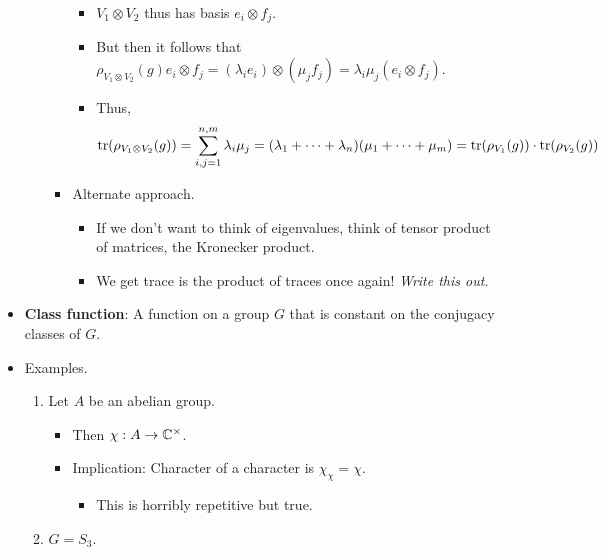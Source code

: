 \documentclass[../notes.tex]{subfiles}
\begin{document}
\begin{itemize}
\begin{enumerate}[resume]
\begin{itemize}
\begin{itemize}
                \item $V_1\otimes V_2$ thus has basis $e_i\otimes f_j$.
                \item But then it follows that $\rho_{V_1\otimes V_2}(g)e_i\otimes f_j=(\lambda_ie_i)\otimes(\mu_jf_j)=\lambda_i\mu_j(e_i\otimes f_j)$.
                \item Thus,
                \begin{equation*}
                    \tr(\rho_{V_1\otimes V_2}(g)) = \sum_{i,j=1}^{n,m}\lambda_i\mu_j
                    = (\lambda_1+\cdots+\lambda_n)(\mu_1+\cdots+\mu_m)
                    = \tr(\rho_{V_1}(g))\cdot\tr(\rho_{V_2}(g))
                \end{equation*}
            \end{itemize}
            \item Alternate approach.
            \begin{itemize}
                \item If we don't want to think of eigenvalues, think of tensor product of matrices, the Kronecker product.
                \item We get trace is the product of traces once again! \emph{Write this out.}
            \end{itemize}
        \end{itemize}
    \end{enumerate}
    \item \textbf{Class function}: A function on a group $G$ that is constant on the conjugacy classes of $G$.
    \item Examples.
    \begin{enumerate}
        \item Let $A$ be an abelian group.
        \begin{itemize}
            \item Then $\chi:A\to\mathbb{C}^\times$.
            \item Implication: Character of a character is $\chi_\chi=\chi$.
            \begin{itemize}
                \item This is horribly repetitive but true.
            \end{itemize}
        \end{itemize}
        \item $G=S_3$.
        \begin{table}[h!]
            \centering
            \small
            \renewcommand{\arraystretch}{1.4}
            \begin{tabular}{c|c|c|c|}

\end{tabular}
\end{table}
\end{enumerate}
\end{itemize}
\end{document}
